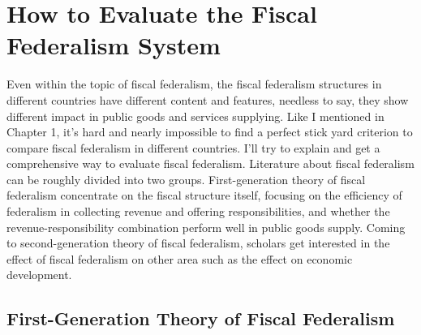 \section{How to Evaluate the Fiscal Federalism System}
Even within the topic of fiscal federalism, the fiscal federalism structures in different countries have different content and features, needless to say, they show different impact in public goods and services supplying. Like I mentioned in Chapter 1, it's hard and nearly impossible to find a perfect stick yard criterion to compare fiscal federalism in different countries. I'll try to explain and get a comprehensive way to evaluate fiscal federalism. Literature about fiscal federalism can be roughly divided into two groups. First-generation theory of fiscal federalism concentrate on the fiscal structure itself, focusing on the efficiency of federalism in collecting revenue and offering responsibilities, and whether the revenue-responsibility combination perform well in public goods supply. Coming to second-generation theory of fiscal federalism, scholars get interested in the effect of fiscal federalism on other area such as the effect on economic development.

\subsection{First-Generation Theory of Fiscal Federalism}



